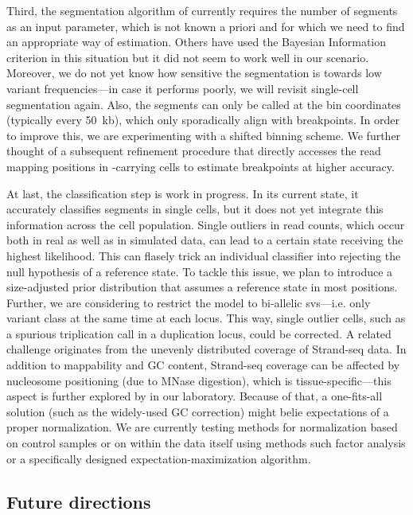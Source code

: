 Third, the segmentation algorithm of \mc currently requires the number of segments as an
input parameter, which is not known a priori and for which we need to find an
appropriate way of estimation.  Others have used the Bayesian Information
criterion in this situation \citep{Huber2006} but it did not seem to work well
in our scenario. Moreover, we do not yet know how sensitive the segmentation is
towards low variant frequencies---in case it performs poorly, we will revisit
single-cell segmentation again. Also, the segments can only be called at the bin
coordinates (typically every 50~kb), which only sporadically align with \sv
breakpoints. In order to improve this, we are experimenting with a shifted
binning scheme. We further thought of a subsequent refinement procedure that
directly accesses the read mapping positions in \sv-carrying cells to estimate
breakpoints at higher accuracy.

At last, the classification step is work in progress. In its current state, it
accurately classifies segments in single cells, but it does not yet integrate
this information across the cell population. Single outliers in read counts,
which occur both in real as well as in simulated data, can lead to a certain
\sv state receiving the highest likelihood. This can flasely trick an individual
classifier into rejecting the null hypothesis of a reference state.
To tackle this issue, we plan to introduce a size-adjusted prior distribution that
assumes a reference state in most positions.
Further, we are considering to restrict the model to bi-allelic \acp{sv}---i.e.
only variant class at the same time at each locus. This way, single outlier
cells, such as a spurious triplication call in a duplication locus, could be
corrected. A related challenge originates from the unevenly distributed coverage
of Strand-seq data. In addition to mappability and GC content, Strand-seq
coverage can be affected by nucleosome positioning (due to MNase digestion),
which is tissue-specific---this aspect is further explored by \hyobin in our
laboratory. Because of that, a one-fits-all solution (such as the widely-used GC
correction) might belie expectations of a proper normalization. We are currently
testing methods for normalization based on control samples or on within the data
itself using methods such factor analysis \citep{Stegle2012} or a specifically
designed expectation-maximization algorithm.



\subsection{Future directions}
\label{sec:mosaic_outlook}

